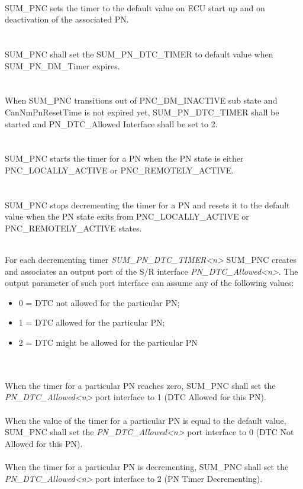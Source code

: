 \\
SUM_PNC sets the timer to the default value on ECU start up and on deactivation of the associated PN.
\\
\\
\\
SUM_PNC shall set the SUM_PN_DTC_TIMER to default value when SUM_PN_DM_Timer expires.
\\
{}
\\
\\
When SUM_PNC transitions out of PNC_DM_INACTIVE sub state and CanNmPnResetTime is not expired yet, SUM_PN_DTC_TIMER shall be started and PN_DTC_Allowed Interface shall be set to 2.
\\
\\
\\
SUM_PNC starts the timer for a PN when the PN state is either PNC_LOCALLY_ACTIVE or PNC_REMOTELY_ACTIVE.
\\
\\
\\
SUM_PNC stops decrementing the timer for a PN and resets it to the default value when the PN state exits from PNC_LOCALLY_ACTIVE or PNC_REMOTELY_ACTIVE states.
\\

\\
For each decrementing timer \textit{SUM_PN_DTC_TIMER<n>} SUM_PNC creates and associates an output port of the S/R interface \textit{PN_DTC_Allowed<n>}. 
The output parameter of such port interface can assume any of the following values:

\begin{itemize}
	\item 0 = DTC not allowed for the particular PN;
	\item 1 = DTC allowed for the particular PN;
	\item 2 = DTC might be allowed for the particular PN
\end{itemize}
	
 
\\
\\
When the timer for a particular PN reaches zero, SUM_PNC shall set the \textit{PN_DTC_Allowed<n>} port interface to 1 (DTC Allowed for this PN).
\\
\\
When the value of the timer for a particular PN is equal to the default value, SUM_PNC shall set the \textit{PN_DTC_Allowed<n>} port interface to 0 (DTC Not Allowed for this PN).
\\
\\
When the timer for a particular PN is decrementing, SUM_PNC shall set the \textit{PN_DTC_Allowed<n>} port interface to 2 (PN Timer Decrementing).
\\

